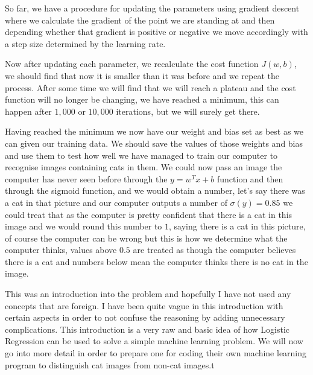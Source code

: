 So far, we have a procedure for updating the parameters using gradient
descent where we calculate the gradient of the point we are standing
at and then depending whether that gradient is positive or negative
we move accordingly with a step size determined by the learning rate.

Now after updating each parameter, we recalculate the cost function
$J(w,b)$, we should find that now it is smaller than it was before
and we repeat the process. After some time we will find that we will
reach a plateau and the cost function will no longer be changing,
we have reached a minimum, this can happen after $1,000$ or 
$10,000$ iterations, but we will surely get there.

Having reached the minimum we now have our weight and bias set
as best as we can given our training data. We should save the
values of those weights and bias and use them to test how well
we have managed to train our computer to recognise images containing
cats in them. We could now pass an image the computer has never 
seen before through the $y = w^T x + b$ function and then through
the sigmoid function, and we would obtain a number, let's say there 
was a cat in that picture and our computer outputs a number of
$\sigma(y) = 0.85$ we could treat that as the computer is pretty
confident that there is a cat in this image and we would round 
this number to $1$, saying there is a cat in this picture, of course
the computer can be wrong but this is how we determine what the 
computer thinks, values above $0.5$ are treated as though the
computer believes there is a cat and numbers below mean the 
computer thinks there is no cat in the image.

This was an introduction into the problem and hopefully I have not
used any concepts that are foreign. I have been quite vague in this
introduction with certain aspects in order to not confuse the
reasoning by adding unnecessary complications. This introduction
is a very raw and basic idea of how Logistic Regression can be
used to solve a simple machine learning problem. We will now go into
more detail in order to prepare one for coding their own machine
learning program to distinguish cat images from non-cat images.t
